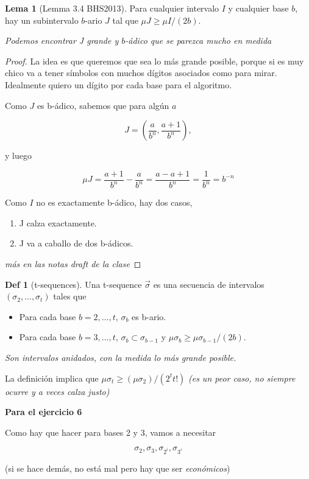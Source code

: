 \documentclass{report}
\theoremstyle{definition} %
\newtheorem{lemma}{Lema}[chapter]
\newtheorem*{definition*}{Def}
\newcommand{\sigmatsequence}{\overset{\rightarrow}{\sigma}}
\newenvironment{nota}[1]
    {\begin{leftbar}\textbf{#1}}
    {\end{leftbar}}
\begin{document}
\begin{lemma}[Lemma 3.4 BHS2013]

    Para cualquier intervalo $I$ y cualquier base $b$, hay un subintervalo
    $b$-ario $J$ tal que $\mu J \geq \mu I / (2b)$.

    \textit{Podemos encontrar J grande y $b$-ádico que se parezca mucho en medida}
\end{lemma}
\begin{proof}
    La idea es que queremos que sea lo más grande posible, porque si es muy
    chico va a tener símbolos con muchos dígitos asociados como para mirar.
    Idealmente quiero un dígito por cada base para el algoritmo.

    Como $J$ es b-ádico, sabemos que para algún $a$

    $$J = \left(\frac{a}{b^n}, \frac{a+1}{b^n}\right),$$

    y luego

    \[
        \mu J = \frac{a+1}{b^n} - \frac{a}{b^n} = \frac{a - a + 1}{b^n} = \frac{1}{b^n} = b^{-n}
    \]

    Como $I$ no es exactamente b-ádico, hay dos casos,

    \begin{enumerate}
        \item J calza exactamente.
        \item J va a caballo de dos b-ádicos.
    \end{enumerate}

    \textit{más en las notas draft de la clase}
\end{proof}

\begin{definition*}[t-sequences]
    Una t-sequence $\sigmatsequence$ es una secuencia de intervalos $(\sigma_2,
    \dots, \sigma_t)$ tales que

    \begin{itemize}
        \item Para cada base $b = 2, \dots, t$, $\sigma_b$ es b-ario.
        \item Para cada base $b = 3, \dots, t$, $\sigma_b \subset \sigma_{b-1}$
        y $\mu \sigma_b \geq \mu \sigma_{b-1} / (2b)$.
    \end{itemize}

    \textit{Son intervalos anidados, con la medida lo más grande posible.}

    La definición implica que $\mu \sigma_t \geq (\mu \sigma_2)/(2^t t!)$
    \textit{(es un peor caso, no siempre ocurre y a veces calza justo)}
    \begin{nota}{Para el ejercicio 6}

        Como hay que hacer para bases 2 y 3, vamos a necesitar
    
        \[
            \sigma_2, \sigma_3, \sigma_{2^i}, \sigma_{3^i}
        \]
    
        (si se hace demás, no está mal pero hay que ser \textit{económicos})
    \end{nota}

\end{definition*}
\end{document}
